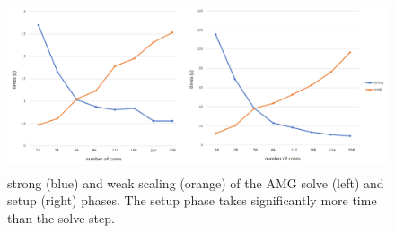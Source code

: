 \begin{figure}[H]
 \centering
 \includegraphics[width=13cm,height=5cm]{./figures/solvesetup.png}
 \caption{strong (blue) and weak scaling (orange) of the AMG solve (left) and setup (right) phases.
          The setup phase takes significantly more time than the solve step.}
 \label{fig:solvesetup}
\end{figure}
